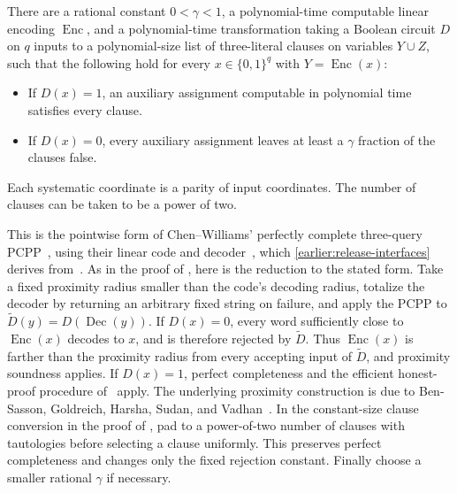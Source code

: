 \begin{imported}\label{earlier:g:imp:three-pcpp}
There are a rational constant $0<\gamma<1$, a polynomial-time
computable linear encoding $\operatorname{Enc}$, and a polynomial-time
transformation taking a Boolean circuit $D$ on $q$ inputs to a
polynomial-size list of three-literal clauses on variables $Y\cup Z$,
such that the following hold for every $x\in\{0,1\}^q$ with
$Y=\operatorname{Enc}(x)$:
\begin{itemize}
\item If $D(x)=1$, an auxiliary assignment computable in polynomial
time satisfies every clause.
\item If $D(x)=0$, every auxiliary assignment leaves at least a
$\gamma$ fraction of the clauses false.
\end{itemize}
Each systematic coordinate is a parity of input coordinates. The
number of clauses can be taken to be a power of two.
\end{imported}

This is the pointwise form of Chen--Williams' perfectly complete
three-query PCPP~\cite[Lemma~24 and Appendix~A]{CW19}, using their
linear code and decoder~\cite[Lemma~27]{CW19}, which \cref{earlier:release-interfaces} derives from~\cite[Lemma~26]{CW19}. As in the proof of
\cite[Theorem~5]{CW19}, here is the reduction to the stated form. Take a fixed proximity radius smaller than the
code's decoding radius, totalize the decoder by returning an arbitrary
fixed string on failure, and apply the PCPP to
$\widetilde D(y)=D(\operatorname{Dec}(y))$. If $D(x)=0$, every word sufficiently
close to $\operatorname{Enc}(x)$ decodes to $x$, and is therefore
rejected by $\widetilde D$. Thus $\operatorname{Enc}(x)$ is farther than the
proximity radius from every accepting input of $\widetilde D$, and proximity
soundness applies. If $D(x)=1$, perfect completeness and the efficient
honest-proof procedure of~\cite[Lemma~24]{CW19} apply. The underlying proximity construction
is due to Ben-Sasson, Goldreich, Harsha, Sudan, and
Vadhan~\cite{BGHSV06}. In the constant-size clause conversion in
the proof of \cite[Lemma~24]{CW19}, pad to a power-of-two number of
clauses with tautologies before selecting a clause uniformly. This
preserves perfect completeness and changes only the fixed rejection
constant. Finally choose a smaller rational $\gamma$ if necessary.

